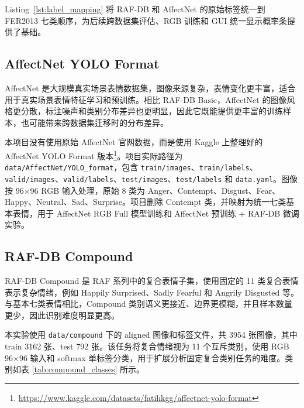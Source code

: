 \documentclass[UTF8,a4paper,12pt]{ctexart}
\newcommand{\code}[1]{\texttt{#1}}
\newcommand{\sourceurl}[1]{\footnote{\url{#1}}}
\begin{document}
Listing~\ref{lst:label_mapping} 将 RAF-DB 和 AffectNet 的原始标签统一到 FER2013 七类顺序，为后续跨数据集评估、RGB 训练和 GUI 统一显示概率条提供了基础。

\subsection{AffectNet YOLO Format}

AffectNet 是大规模真实场景表情数据集，图像来源复杂，表情变化更丰富，适合用于真实场景表情特征学习和预训练。相比 RAF-DB Basic，AffectNet 的图像风格更分散，标注噪声和类别分布差异也更明显，因此它既能提供更丰富的训练样本，也可能带来跨数据集迁移时的分布差异。

本项目没有使用原始 AffectNet 官网数据，而是使用 Kaggle 上整理好的 AffectNet YOLO Format 版本\sourceurl{https://www.kaggle.com/datasets/fatihkgg/affectnet-yolo-format}。项目实际路径为 \code{data/AffectNet/YOLO\_format}，包含 \code{train/images}、\code{train/labels}、\code{valid/images}、\code{valid/labels}、\code{test/images}、\code{test/labels} 和 \code{data.yaml}。图像按 96$\times$96 RGB 输入处理，原始 8 类为 Anger、Contempt、Disgust、Fear、Happy、Neutral、Sad、Surprise。项目删除 Contempt 类，并映射为统一七类基本表情，用于 AffectNet RGB Full 模型训练和 AffectNet 预训练 + RAF-DB 微调实验。

\subsection{RAF-DB Compound}

RAF-DB Compound 是 RAF 系列中的复合表情子集，使用固定的 11 类复合表情表示复杂情绪，例如 Happily Surprised、Sadly Fearful 和 Angrily Disgusted 等。与基本七类表情相比，Compound 类别语义更接近、边界更模糊，并且样本数量更少，因此识别难度明显更高。

本实验使用 \code{data/compound} 下的 aligned 图像和标签文件，共 3954 张图像，其中 train 3162 张、test 792 张。该任务将复合情绪视为 11 个互斥类别，使用 RGB 96$\times$96 输入和 softmax 单标签分类，用于扩展分析固定复合类别任务的难度。类别如表 \ref{tab:compound_classes} 所示。
\end{document}
